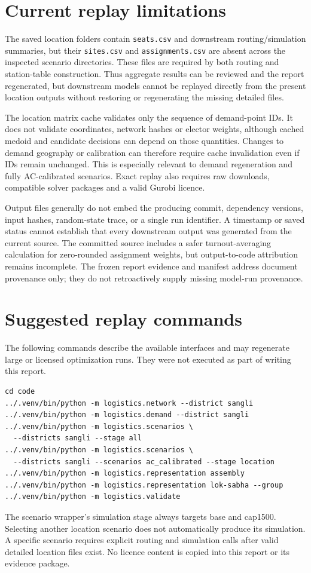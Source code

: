 \documentclass[11pt,a4paper,oneside]{report}
\newcommand{\source}[1]{\par\nopagebreak[4]{\footnotesize\color{teal}Evidence: #1.}\par}
\begin{document}
\section{Current replay limitations}
The saved location folders contain \texttt{seats.csv} and downstream routing/simulation summaries, but their \texttt{sites.csv} and \texttt{assignments.csv} are absent across the inspected scenario directories. These files are required by both routing and station-table construction. Thus aggregate results can be reviewed and the report regenerated, but downstream models cannot be replayed directly from the present location outputs without restoring or regenerating the missing detailed files.

The location matrix cache validates only the sequence of demand-point IDs. It does not validate coordinates, network hashes or elector weights, although cached medoid and candidate decisions can depend on those quantities. Changes to demand geography or calibration can therefore require cache invalidation even if IDs remain unchanged. This is especially relevant to demand regeneration and fully AC-calibrated scenarios. Exact replay also requires raw downloads, compatible solver packages and a valid Gurobi licence.

Output files generally do not embed the producing commit, dependency versions, input hashes, random-state trace, or a single run identifier. A timestamp or saved status cannot establish that every downstream output was generated from the current source. The committed source includes a safer turnout-averaging calculation for zero-rounded assignment weights, but output-to-code attribution remains incomplete. The frozen report evidence and manifest address document provenance only; they do not retroactively supply missing model-run provenance.
\source{[S7]--[S11], [S16]}

\section{Suggested replay commands}
The following commands describe the available interfaces and may regenerate large or licensed optimization runs. They were not executed as part of writing this report.
\begin{verbatim}
cd code
../.venv/bin/python -m logistics.network --district sangli
../.venv/bin/python -m logistics.demand --district sangli
../.venv/bin/python -m logistics.scenarios \
  --districts sangli --stage all
../.venv/bin/python -m logistics.scenarios \
  --districts sangli --scenarios ac_calibrated --stage location
../.venv/bin/python -m logistics.representation assembly
../.venv/bin/python -m logistics.representation lok-sabha --group
../.venv/bin/python -m logistics.validate
\end{verbatim}
The scenario wrapper's simulation stage always targets base and cap1500. Selecting another location scenario does not automatically produce its simulation. A specific scenario requires explicit routing and simulation calls after valid detailed location files exist. No licence content is copied into this report or its evidence package.
\end{document}

